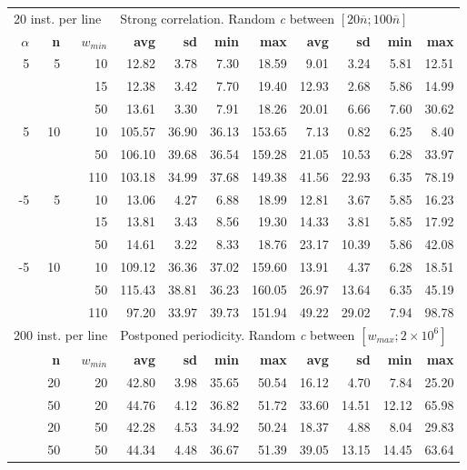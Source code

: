 \documentclass[runningheads,a4paper]{llncs}
\begin{document}
\begin{table}
\begin{tabular}{@{\extracolsep{4pt}}rrrrrrrrrrr@{}}
\multicolumn{3}{l}{20 inst. per line} & \multicolumn{8}{l}{Strong correlation. Random \emph{c} between \([20\overline{n}; 100\overline{n}]\)}\\
\cline{1-3}\cline{4-11}
\textbf{\(\alpha\)} & \textbf{n} & \(w_{min}\) & \textbf{avg} & \textbf{sd} & \textbf{min} & \textbf{max} & \textbf{avg} & \textbf{sd} & \textbf{min} & \textbf{max}\\
\cline{1-3}\cline{4-7}\cline{8-11}
 5 & 5  & 10 & 12.82 & 3.78 & 7.30 & 18.59 & 9.01 & 3.24 & 5.81 & 12.51\\
   &    & 15 & 12.38 & 3.42 & 7.70 & 19.40 & 12.93 & 2.68 & 5.86 & 14.99\\
   &    & 50 & 13.61 & 3.30 & 7.91 & 18.26 & 20.01 & 6.66 & 7.60 & 30.62\\
 5 & 10 & 10 & 105.57 & 36.90 & 36.13 & 153.65 & 7.13 & 0.82 & 6.25 & 8.40\\
   &    & 50 & 106.10 & 39.68 & 36.54 & 159.28 & 21.05 & 10.53 & 6.28 & 33.97\\
   &    & 110 & 103.18 & 34.99 & 37.68 & 149.38 & 41.56 & 22.93 & 6.35 & 78.19\\
-5 & 5  & 10 & 13.06 & 4.27 & 6.88 & 18.99 & 12.81 & 3.67 & 5.85 & 16.23\\
   &    & 15 & 13.81 & 3.43 & 8.56 & 19.30 & 14.33 & 3.81 & 5.85 & 17.92\\
   &    & 50 & 14.61 & 3.22 & 8.33 & 18.76 & 23.17 & 10.39 & 5.86 & 42.08\\
-5 & 10 & 10 & 109.12 & 36.36 & 37.02 & 159.60 & 13.91 & 4.37 & 6.28 & 18.51\\
   &    & 50 & 115.43 & 38.81 & 36.23 & 160.05 & 26.97 & 13.64 & 6.35 & 45.19\\
   &    & 110& 97.20 & 33.97 & 39.73 & 151.94 & 49.22 & 29.02 & 7.94 & 98.78\\
\hline

\multicolumn{3}{l}{200 inst. per line} & \multicolumn{8}{l}{Postponed periodicity. Random \emph{c} between \([w_{max}; 2\times10^6]\)}\\
\cline{1-3}\cline{4-11}
& \textbf{n} & \(w_{min}\) & \textbf{avg} & \textbf{sd} & \textbf{min} & \textbf{max} & \textbf{avg} & \textbf{sd} & \textbf{min} & \textbf{max}\\
\cline{1-3}\cline{4-7}\cline{8-11}
& 20 & 20 & 42.80 & 3.98 & 35.65 & 50.54 & 16.12 & 4.70 & 7.84 & 25.20\\
& 50 & 20 & 44.76 & 4.12 & 36.82 & 51.72 & 33.60 & 14.51 & 12.12 & 65.98\\
& 20 & 50 & 42.28 & 4.53 & 34.92 & 50.24 & 18.37 & 4.88 & 8.04 & 29.83\\
& 50 & 50 & 44.34 & 4.48 & 36.67 & 51.39 & 39.05 & 13.15 & 14.45 & 63.64\\


\end{tabular}
\end{table}
\end{document}

